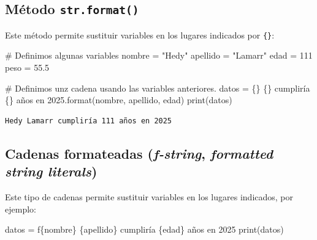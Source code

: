 \documentclass[
  spanish,
  letterpaper,
]{scrbook}
\newenvironment{Shaded}{\begin{snugshade}}{\end{snugshade}}
\newcommand{\BuiltInTok}[1]{\textcolor[rgb]{0.00,0.23,0.31}{#1}}
\newcommand{\CommentTok}[1]{\textcolor[rgb]{0.37,0.37,0.37}{#1}}
\newcommand{\DecValTok}[1]{\textcolor[rgb]{0.68,0.00,0.00}{#1}}
\newcommand{\FloatTok}[1]{\textcolor[rgb]{0.68,0.00,0.00}{#1}}
\newcommand{\NormalTok}[1]{\textcolor[rgb]{0.00,0.23,0.31}{#1}}
\newcommand{\OperatorTok}[1]{\textcolor[rgb]{0.37,0.37,0.37}{#1}}
\newcommand{\SpecialCharTok}[1]{\textcolor[rgb]{0.37,0.37,0.37}{#1}}
\newcommand{\SpecialStringTok}[1]{\textcolor[rgb]{0.13,0.47,0.30}{#1}}
\newcommand{\StringTok}[1]{\textcolor[rgb]{0.13,0.47,0.30}{#1}}
\theoremstyle{definition}
\theoremstyle{remark}
\begin{document}
\subsection{\texorpdfstring{Método
\texttt{str.format()}}{Método str.format()}}\label{muxe9todo-str.format}

Este método permite sustituir variables en los lugares indicados por
\texttt{\{\}}:

\begin{Shaded}
\begin{Highlighting}[]
\CommentTok{\# Definimos algunas variables}
\NormalTok{nombre }\OperatorTok{=} \StringTok{"Hedy"}
\NormalTok{apellido }\OperatorTok{=} \StringTok{"Lamarr"}
\NormalTok{edad }\OperatorTok{=} \DecValTok{111}
\NormalTok{peso }\OperatorTok{=} \FloatTok{55.5}

\CommentTok{\# Definimos unz cadena usando las variables anteriores.}
\NormalTok{datos }\OperatorTok{=} \StringTok{\textquotesingle{}}\SpecialCharTok{\{\}}\StringTok{ }\SpecialCharTok{\{\}}\StringTok{ cumpliría }\SpecialCharTok{\{\}}\StringTok{ años en 2025\textquotesingle{}}\NormalTok{.}\BuiltInTok{format}\NormalTok{(nombre, apellido, edad)}
\BuiltInTok{print}\NormalTok{(datos)}
\end{Highlighting}
\end{Shaded}

\begin{verbatim}
Hedy Lamarr cumpliría 111 años en 2025
\end{verbatim}

\subsection{\texorpdfstring{Cadenas formateadas (\emph{f-string},
\emph{formatted string
literals})}{Cadenas formateadas (f-string, formatted string literals)}}\label{cadenas-formateadas-f-string-formatted-string-literals}

Este tipo de cadenas permite sustituir variables en los lugares
indicados, por ejemplo:

\begin{Shaded}
\begin{Highlighting}[]
\NormalTok{datos }\OperatorTok{=} \SpecialStringTok{f\textquotesingle{}}\SpecialCharTok{\{}\NormalTok{nombre}\SpecialCharTok{\}}\SpecialStringTok{ }\SpecialCharTok{\{}\NormalTok{apellido}\SpecialCharTok{\}}\SpecialStringTok{ cumpliría }\SpecialCharTok{\{}\NormalTok{edad}\SpecialCharTok{\}}\SpecialStringTok{ años en 2025\textquotesingle{}}
\BuiltInTok{print}\NormalTok{(datos)}
\end{Highlighting}
\end{Shaded}
\end{document}
